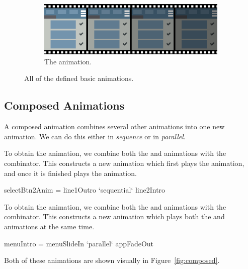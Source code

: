 \begin{figure}[!htbp]
\begin{subfigure}[h]{\textwidth}
\centering
\includegraphics[width=\figscale\textwidth]{pictures/appFadeOutFig}
\caption{The  animation.}
\label{fig:basic2_2}
\end{subfigure}

\caption{All of the defined basic animations.}
\label{fig:basic}
\end{figure}

\subsection{Composed Animations}

A composed animation combines several other animations into one new animation. We can do this either in \emph{sequence} or in \emph{parallel}.

To obtain the  animation, we combine both the  and  animations with the  combinator. This constructs a new animation which first plays the  animation, and once it is finished plays the  animation.

\begin{spec}
selectBtn2Anim = line1Outro `sequential` line2Intro
\end{spec}

To obtain the  animation, we combine both the  and  animations with the  combinator. This constructs a new animation which plays both the  and  animations at the same time.

\begin{spec}
menuIntro = menuSlideIn `parallel` appFadeOut
\end{spec}

Both of these animations are shown visually in Figure~\ref{fig:composed}.

